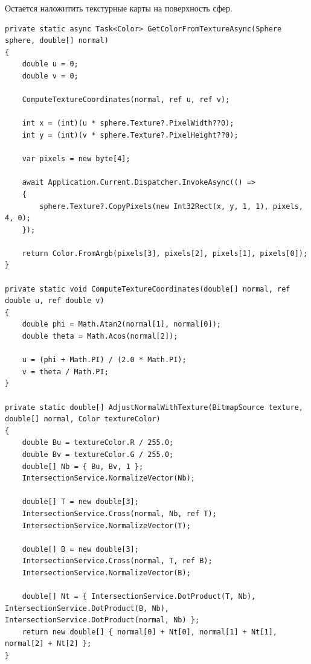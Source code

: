 Остается наложитить текстурные карты на поверхность сфер.

\begin{lstlisting}[caption={Учет текстуры на поверхности сфер.}, label={lst:3-5}]
private static async Task<Color> GetColorFromTextureAsync(Sphere sphere, double[] normal)
{
	double u = 0;
	double v = 0;
	
	ComputeTextureCoordinates(normal, ref u, ref v);
	
	int x = (int)(u * sphere.Texture?.PixelWidth??0);
	int y = (int)(v * sphere.Texture?.PixelHeight??0);
	
	var pixels = new byte[4];
	
	await Application.Current.Dispatcher.InvokeAsync(() =>
	{
		sphere.Texture?.CopyPixels(new Int32Rect(x, y, 1, 1), pixels, 4, 0);
	});
	
	return Color.FromArgb(pixels[3], pixels[2], pixels[1], pixels[0]);
}

private static void ComputeTextureCoordinates(double[] normal, ref double u, ref double v)
{
	double phi = Math.Atan2(normal[1], normal[0]);
	double theta = Math.Acos(normal[2]);
	
	u = (phi + Math.PI) / (2.0 * Math.PI);
	v = theta / Math.PI;
}

private static double[] AdjustNormalWithTexture(BitmapSource texture, double[] normal, Color textureColor)
{
	double Bu = textureColor.R / 255.0;
	double Bv = textureColor.G / 255.0;
	double[] Nb = { Bu, Bv, 1 };
	IntersectionService.NormalizeVector(Nb);
	
	double[] T = new double[3];
	IntersectionService.Cross(normal, Nb, ref T);
	IntersectionService.NormalizeVector(T);
	
	double[] B = new double[3];
	IntersectionService.Cross(normal, T, ref B);
	IntersectionService.NormalizeVector(B);
	
	double[] Nt = { IntersectionService.DotProduct(T, Nb), IntersectionService.DotProduct(B, Nb), IntersectionService.DotProduct(normal, Nb) };
	return new double[] { normal[0] + Nt[0], normal[1] + Nt[1], normal[2] + Nt[2] };
}
\end{lstlisting}

